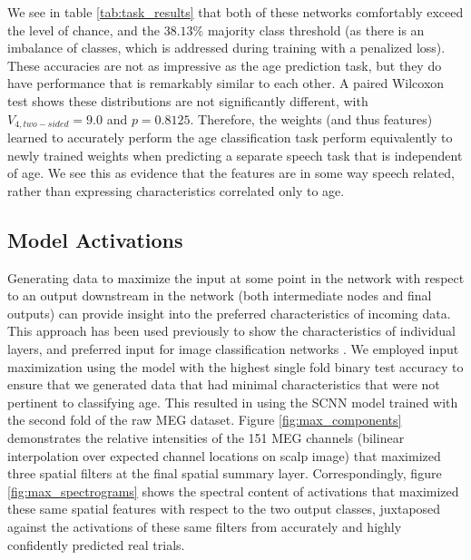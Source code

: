 \documentclass[fleqn,10pt]{wlscirep}
\begin{document}
We see in table \ref{tab:task_results} that both of these networks comfortably exceed the level of chance, and the $38.13\%$ majority class threshold (as there is an imbalance of classes, which is addressed during training with a penalized loss). These accuracies are not as impressive as the age prediction task, but they do have performance that is remarkably similar to each other. A paired Wilcoxon test shows these distributions are not significantly different, with $V_{4, two-sided}=9.0$ and $p=0.8125$. Therefore, the weights (and thus features) learned to accurately perform the age classification task perform equivalently to newly trained weights when predicting a separate speech task that is independent of age. We see this as evidence that the features are in some way speech related, rather than expressing characteristics correlated only to age.

\subsection*{Model Activations}

Generating data to maximize the input at some point in the network with respect to an output downstream in the network (both intermediate nodes and final outputs) can provide insight into the preferred characteristics of incoming data. This approach has been used previously to show the characteristics of individual layers, and preferred input for image classification networks \cite{Yosinski2015}. We employed input maximization using the model with the highest single fold binary test accuracy to ensure that we generated data that had minimal characteristics that were not pertinent to classifying age. This resulted in using the SCNN model trained with the second fold of the raw MEG dataset. Figure \ref{fig:max_components} demonstrates the relative intensities of the 151 MEG channels (bilinear interpolation over expected channel locations on scalp image) that maximized three spatial filters at the final spatial summary layer. Correspondingly, figure \ref{fig:max_spectrograms} shows the spectral content of activations that maximized these same spatial features with respect to the two output classes, juxtaposed against the activations of these same filters from accurately and highly confidently predicted real trials.
\end{document}
